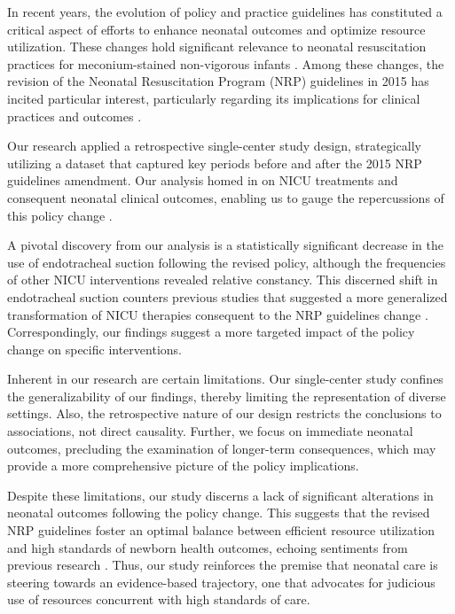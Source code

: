 \documentclass[11pt]{article}
\begin{document}
In recent years, the evolution of policy and practice guidelines has constituted a critical aspect of efforts to enhance neonatal outcomes and optimize resource utilization. These changes hold significant relevance to neonatal resuscitation practices for meconium-stained non-vigorous infants \cite{Carbine2000VideoRA, Bhutani2008DevelopingAS}. Among these changes, the revision of the Neonatal Resuscitation Program (NRP) guidelines in 2015 has incited particular interest, particularly regarding its implications for clinical practices and outcomes \cite{Wiswell2000DeliveryRM}.

Our research applied a retrospective single-center study design, strategically utilizing a dataset that captured key periods before and after the 2015 NRP guidelines amendment. Our analysis homed in on NICU treatments and consequent neonatal clinical outcomes, enabling us to gauge the repercussions of this policy change \cite{Myers2020ImpactOT}. 

A pivotal discovery from our analysis is a statistically significant decrease in the use of endotracheal suction following the revised policy, although the frequencies of other NICU interventions revealed relative constancy. This discerned shift in endotracheal suction counters previous studies that suggested a more generalized transformation of NICU therapies consequent to the NRP guidelines change \cite{Mousavi2011ASR}. Correspondingly, our findings suggest a more targeted impact of the policy change on specific interventions.

Inherent in our research are certain limitations. Our single-center study confines the generalizability of our findings, thereby limiting the representation of diverse settings. Also, the retrospective nature of our design restricts the conclusions to associations, not direct causality. Further, we focus on immediate neonatal outcomes, precluding the examination of longer-term consequences, which may provide a more comprehensive picture of the policy implications.

Despite these limitations, our study discerns a lack of significant alterations in neonatal outcomes following the policy change. This suggests that the revised NRP guidelines foster an optimal balance between efficient resource utilization and high standards of newborn health outcomes, echoing sentiments from previous research \cite{Wiswell2000DeliveryRM}. Thus, our study reinforces the premise that neonatal care is steering towards an evidence-based trajectory, one that advocates for judicious use of resources concurrent with high standards of care. 
\end{document}
